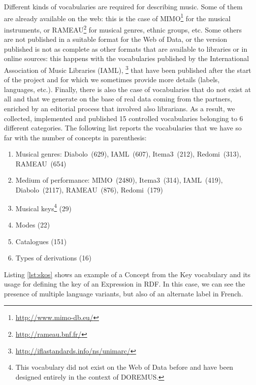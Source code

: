 Different kinds of vocabularies are required for describing music.
Some of them are already available on the web: this is the case of MIMO\footnote{\url{http://www.mimo-db.eu/}} for the musical instruments, or RAMEAU\footnote{\url{http://rameau.bnf.fr/}} for musical genres, ethnic groups, etc. Some others are not published in a suitable format for the Web of Data, or the version published is not as complete as other formats that are available to libraries or in online sources: this happens with the vocabularies published by the International Association of Music Libraries (IAML), \footnote{\url{http://iflastandards.info/ns/unimarc/}} that have been published after the start of the project and for which we sometimes provide more details (labels, languages, etc.). Finally, there is also the case of vocabularies that do not exist at all and that we generate on the base of real data coming from the partners, enriched by an editorial process that involved also librarians. As a result, we collected, implemented and published 15 controlled vocabularies belonging to 6 different categories. The following list reports the vocabularies that we have so far with the number of concepts in parenthesis:
\begin{enumerate}
 \item{Musical genres: Diabolo~(629), IAML~(607), Itema3~(212), Redomi~(313), RAMEAU~(654)}
 \item{Medium of performance: MIMO~(2480), Itema3~(314), IAML~(419), Diabolo~(2117), RAMEAU~(876), Redomi~(179) }
 \item{Musical keys\footnote{\label{newvoc}This vocabulary did not exist on the Web of Data before and have been designed entirely in the context of DOREMUS.} (29)}
 \item{Modes (22)}
 \item{Catalogues (151)}
 \item{Types of derivations (16)}
\end{enumerate}

Listing \ref{lst:skos} shows an example of a Concept from the Key vocabulary and its usage for defining the key of an Expression in RDF. In this case, we can see the presence of multiple language variants, but also of an alternate label in French.

